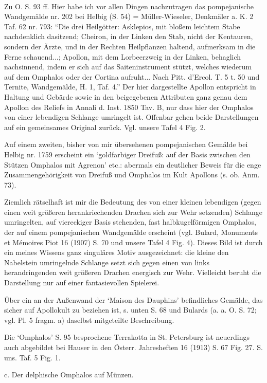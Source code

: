 \documentclass[a4paper, 11pt, oneside]{article}
\begin{document}
\paragraph{}
Zu O. S. 93 ff. Hier habe ich vor allen Dingen nachzutragen das pompejanische Wandgemälde nr. 202 bei Helbig (S. 54) = Müller-Wieseler, Denkmäler a. K. 2 Taf. 62 nr. 793: "`Die drei Heilgötter: Asklepios, mit bloßem leichtem Stabe nachdenklich dasitzend; Cheiron, in der Linken den Stab, nicht der Kentauren, sondern der Ärzte, und in der Rechten Heilpflanzen haltend, aufmerksam in die Ferne schauend...; Apollon, mit dem Lorbeerzweig in der Linken, behaglich nachsinnend, indem er sich auf das Saiteninstrument stützt, welches wiederum auf dem Omphalos oder der Cortina aufruht... Nach Pitt. d'Ercol. T. 5 t. 50 und Ternite, Wandgemälde, H. 1, Taf. 4."' Der hier dargestellte Apollon entspricht in Haltung und Gebärde sowie in den beigegebenen Attributen ganz genau dem Apollon des Reliefs in Annali d. Inst. 1850 Tav. B, nur dass hier der Omphalos von einer lebendigen Schlange umringelt ist. Offenbar gehen beide Darstellungen auf ein gemeinsames Original zurück. Vgl. unsere Tafel 4 Fig. 2.

Auf einem zweiten, bisher von mir übersehenen pompejanischen Gemälde bei Helbig nr. 1759 erscheint ein `goldfarbiger Dreifuß: auf der Basis zwischen den Stützen Omphalos mit Agrenon' etc.: abermals ein deutlicher Beweis für die enge Zusammengehörigkeit von Dreifuß und Omphalos im Kult Apollons (s. ob. Anm. 73).

Ziemlich rätselhaft ist mir die Bedeutung des von einer kleinen lebendigen (gegen einen weit größeren herankriechenden Drachen sich zur Wehr setzenden) Schlange umringelten, auf viereckiger Basis stehenden, fast halbkugelförmigen Omphalos, der auf einem pompejanischen Wandgemälde erscheint (vgl. Bulard, Monuments et Mémoires Piot 16 (1907) S. 70 und unsere Tafel 4 Fig. 4). Dieses Bild ist durch ein meines Wissens ganz singuläres Motiv ausgezeichnet: die kleine den Nabelstein umringelnde Schlange setzt sich gegen einen von links herandringenden weit größeren Drachen energisch zur Wehr. Vielleicht beruht die Darstellung nur auf einer fantasievollen Spielerei.

Über ein an der Außenwand der `Maison des Dauphins' befindliches Gemälde, das sicher auf Apollokult zu beziehen ist, s. unten S. 68 und Bulards (a. a. O. S. 72; vgl. Pl. 5 fragm. a) daselbst mitgeteilte Beschreibung.

Die `Omphalos' S. 95 besprochene Terrakotta in St. Petersburg ist neuerdings auch abgebildet bei Hauser in den Österr. Jahresheften 16 (1913) S. 67 Fig. 27. S. uns. Taf. 5 Fig. 1.
\begin{center}
c. Der delphische Omphalos auf Münzen.
\end{center}
\end{document}
